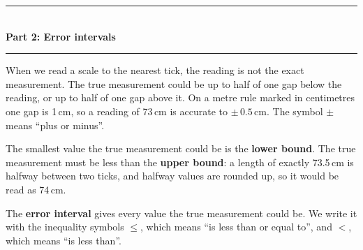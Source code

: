 \documentclass[11pt,a4paper]{article}
\newcommand{\parttitle}[2]{%
  \vspace{1pt}
  {\color{blue!45!black}\rule{\linewidth}{1pt}}\\[1pt]
  {\large\bfseries Part #1: #2}\\[-6pt]
  {\color{blue!45!black}\rule{\linewidth}{0.4pt}}
  \par\vspace{-3pt}}
\begin{document}
\newpage
\parttitle{2}{Error intervals}

\begin{keyidea}
When we read a scale to the nearest tick, the reading is not the exact
measurement. The true measurement could be up to half of one gap below the
reading, or up to half of one gap above it. On a metre rule marked in
centimetres one gap is 1\,cm, so a reading of 73\,cm is accurate to
$\pm\,0.5$\,cm. The symbol $\pm$ means ``plus or minus''.

\smallskip
The smallest value the true measurement could be is the \textbf{lower bound}.
The true measurement must be less than the \textbf{upper bound}: a length of
exactly 73.5\,cm is halfway between two ticks, and halfway values are rounded
up, so it would be read as 74\,cm.

\smallskip
The \textbf{error interval} gives every value the true measurement could be.
We write it with the inequality symbols $\le$, which means ``is less than or
equal to'', and $<$, which means ``is less than''.
\end{keyidea}
\end{document}
